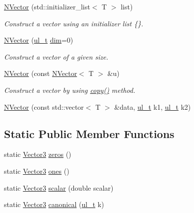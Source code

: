 \begin{DoxyCompactItemize}
\mbox{\hyperlink{class_vector3_a44c7b132c668c2aac890b66fe7ab0262}{N\+Vector}} (std\+::initializer\+\_\+list$<$ T $>$ list)
\begin{DoxyCompactList}\small\item\em Construct a vector using an initializer list {\ttfamily \{\}}. \end{DoxyCompactList}\item 
\mbox{\hyperlink{class_vector3_a58eee5f012e4e563d477788051fc7f1d}{N\+Vector}} (\mbox{\hyperlink{group___n_algebra_ga1b140a2034db3f5dfe18a987745df43a}{ul\+\_\+t}} \mbox{\hyperlink{class_n_vector_a7589027db20509ac4d93490bb9a1979a}{dim}}=0)
\begin{DoxyCompactList}\small\item\em Construct a vector of a given size. \end{DoxyCompactList}\item 
\mbox{\hyperlink{class_vector3_a7f648402b0fc9006ce9ced7ca647e600}{N\+Vector}} (const \mbox{\hyperlink{class_n_vector}{N\+Vector}}$<$ T $>$ \&u)
\begin{DoxyCompactList}\small\item\em Construct a vector by using {\ttfamily \mbox{\hyperlink{class_n_vector_a67128d2ff536b8ccd7a95cb680bd0431}{copy()}}} method. \end{DoxyCompactList}\item 
\mbox{\hyperlink{class_vector3_a402111a5a467efd5741e6a17fbd5c903}{N\+Vector}} (const std\+::vector$<$ T $>$ \&data, \mbox{\hyperlink{group___n_algebra_ga1b140a2034db3f5dfe18a987745df43a}{ul\+\_\+t}} k1, \mbox{\hyperlink{group___n_algebra_ga1b140a2034db3f5dfe18a987745df43a}{ul\+\_\+t}} k2)
\end{DoxyCompactItemize}
\subsection*{Static Public Member Functions}
\begin{DoxyCompactItemize}
\item 
static \mbox{\hyperlink{class_vector3}{Vector3}} \mbox{\hyperlink{class_vector3_adcaf5345746bf7d0f5da092faf8bf27b}{zeros}} ()
\item 
static \mbox{\hyperlink{class_vector3}{Vector3}} \mbox{\hyperlink{class_vector3_a7f32f3b57eb6adbec59af6025e6b7778}{ones}} ()
\item 
static \mbox{\hyperlink{class_vector3}{Vector3}} \mbox{\hyperlink{class_vector3_af757c4bd03bd4ddfa74c99fd5a3eee94}{scalar}} (double scalar)
\item 
static \mbox{\hyperlink{class_vector3}{Vector3}} \mbox{\hyperlink{class_vector3_ab8c97969179c890acca9f18d457e06e6}{canonical}} (\mbox{\hyperlink{group___n_algebra_ga1b140a2034db3f5dfe18a987745df43a}{ul\+\_\+t}} k)
\end{DoxyCompactItemize}
